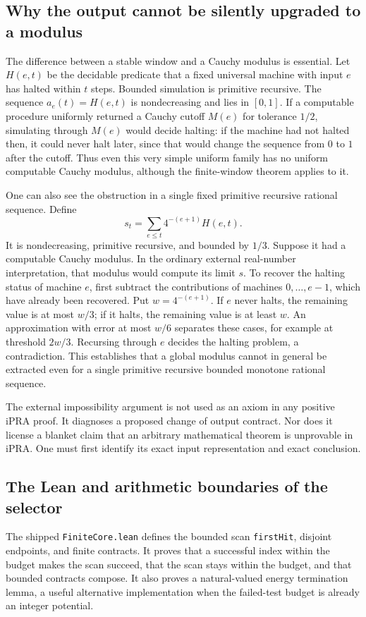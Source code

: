 \subsection{Why the output cannot be silently upgraded to a modulus}

The difference between a stable window and a Cauchy modulus is essential.
Let $H(e,t)$ be the decidable predicate that a fixed universal machine
with input $e$ has halted within $t$ steps. Bounded simulation is primitive
recursive. The sequence $a_e(t)=H(e,t)$ is nondecreasing and lies in
$[0,1]$. If a computable procedure uniformly returned a Cauchy cutoff
$M(e)$ for tolerance $1/2$, simulating through $M(e)$ would decide
halting: if the machine had not halted then, it could never halt later,
since that would change the sequence from $0$ to $1$ after the cutoff.
Thus even this very simple uniform family has no uniform computable
Cauchy modulus, although the finite-window theorem applies to it.

One can also see the obstruction in a single fixed primitive recursive
rational sequence. Define
\[
 s_t=\sum_{e\leq t}4^{-(e+1)}H(e,t).
\]
It is nondecreasing, primitive recursive, and bounded by $1/3$. Suppose
it had a computable Cauchy modulus. In the ordinary external real-number
interpretation, that modulus would compute its limit $s$. To recover the
halting status of machine $e$, first subtract the contributions of
machines $0,\ldots,e-1$, which have already been recovered. Put
$w=4^{-(e+1)}$. If $e$ never halts, the remaining value is at most $w/3$;
if it halts, the remaining value is at least $w$. An approximation with
error at most $w/6$ separates these cases, for example at threshold
$2w/3$. Recursing through $e$ decides the halting problem, a contradiction.
This establishes that a global modulus cannot in general be extracted
even for a single primitive recursive bounded monotone rational sequence.

The external impossibility argument is not used as an axiom in any
positive iPRA proof. It diagnoses a proposed change of output contract.
Nor does it license a blanket claim that an arbitrary mathematical
theorem is unprovable in iPRA. One must first identify its exact input
representation and exact conclusion.

\subsection{The Lean and arithmetic boundaries of the selector}

The shipped \texttt{FiniteCore.lean} defines the bounded scan
\texttt{firstHit}, disjoint endpoints, and finite contracts. It proves
that a successful index within the budget makes the scan succeed, that
the scan stays within the budget, and that bounded contracts compose.
It also proves a natural-valued energy termination lemma, a useful
alternative implementation when the failed-test budget is already an
integer potential.

